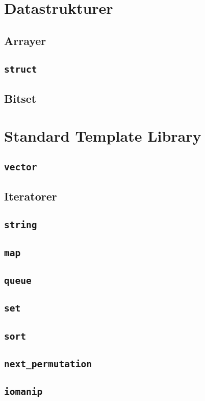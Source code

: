 \documentclass[10pt,a4paper]{report}
\begin{document}
\section{Datastrukturer}
\subsection{Arrayer}
\subsection{\texttt{struct}}
\subsection{Bitset}

\section{Standard Template Library}
\subsection{\texttt{vector}}
\subsection{Iteratorer}
\subsection{\texttt{string}}
\subsection{\texttt{map}}
\subsection{\texttt{queue}}
\subsection{\texttt{set}}
\subsection{\texttt{sort}}
\subsection{\texttt{next\_permutation}}
\subsection{\texttt{iomanip}}

\end{document}
